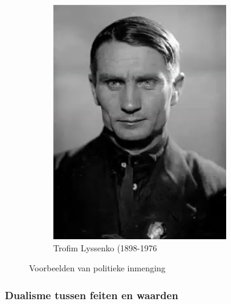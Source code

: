 \documentclass[../summary.tex]{subfiles}
\begin{document}
\begin{figure} [htbp]
\begin{subfigure}{0.3\linewidth}
			\includegraphics[width=\linewidth]{images/2-lyssenko.png}
			\caption{Trofim Lyssenko (1898-1976}
			\label{fig:lyssenko}
		\end{subfigure}
		\caption{Voorbeelden van politieke inmenging}
		\label{fig:politieke-inmenging}
	\end{figure}
	
	\subsubsection{Dualisme tussen feiten en waarden}
	
\end{document}
